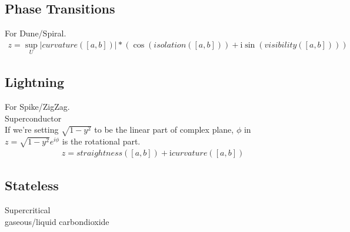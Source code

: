 \documentclass{report}
\begin{document}
\subsection{Phase Transitions}
For Dune/Spiral.
\begin{align}
z =  \sup_{U}\lvert curvature([a,b]) \rvert*(\cos{(isolation([a,b]))} +\mathrm{i} \sin{(visibility([a,b]))})
\end{align}

\subsection{Lightning}
For Spike/ZigZag.\\
Superconductor\\
If we're setting $\sqrt{1-y^2}$ to be the linear part of complex plane, $\phi$ in $z=\sqrt{1-y^2}e^{i\phi}$ is the rotational part.
\begin{align}
z =  straightness([a,b]) + \mathrm{i} curvature([a,b])
\end{align}

\subsection{Stateless}
Supercritical\\
gaseous/liquid carbondioxide

\iffalse
\printbibliography
\fi
{}

\end{document}
